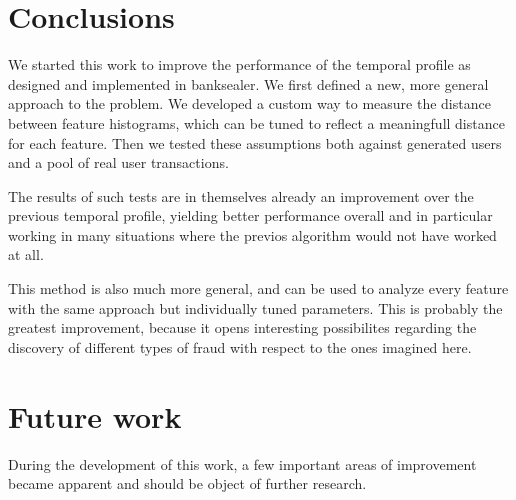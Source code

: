 \section{Conclusions}

We started this work to improve the performance of the temporal profile as designed and implemented in banksealer. We first defined a new, more general approach to the problem. We developed a custom way to measure the distance between feature histograms, which can be tuned to reflect a meaningfull distance for each feature. Then we tested these assumptions both against generated users and a pool of real user transactions.

The results of such tests are in themselves already an improvement over the previous temporal profile, yielding better performance overall and in particular working in many situations where the previos algorithm would not have worked at all.

This method is also much more general, and can be used to analyze every feature with the same approach but individually tuned parameters. This is probably the greatest improvement, because it opens interesting possibilites regarding the discovery of different types of fraud with respect to the ones imagined here.

\section{Future work}

During the development of this work, a few important areas of improvement became apparent and should be object of further research.

